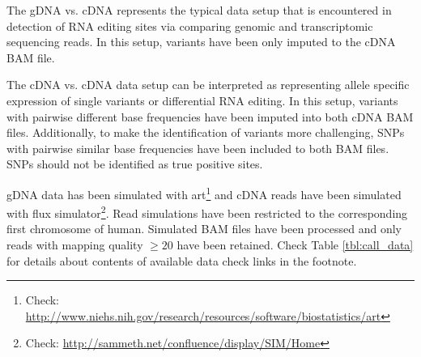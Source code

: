 \documentclass[10pt,a4paper,final]{article}
\begin{document}
The gDNA vs. cDNA represents the typical data setup that is encountered in detection of RNA editing
sites via comparing genomic and transcriptomic sequencing reads. In this setup, variants have been
only imputed to the cDNA BAM file.

The cDNA vs. cDNA data setup can be interpreted as representing allele specific expression of single
variants or differential RNA editing. In this setup, variants with pairwise different base
frequencies have been imputed into both cDNA BAM files. Additionally, to make the identification of
variants more challenging, SNPs with pairwise similar base frequencies have been included to both
BAM files. SNPs should not be identified as true positive sites.

gDNA data has been simulated with art\footnote{Check: 
\url{http://www.niehs.nih.gov/research/resources/software/biostatistics/art}} and cDNA reads
have been simulated with flux simulator\footnote{Check: \url{http://sammeth.net/confluence/display/SIM/Home}}.
Read simulations have been restricted to the corresponding first chromosome of human. Simulated BAM
files have been processed and only reads with mapping quality $\ge 20$ have been retained. Check
Table \ref{tbl:call_data} for details about contents of available data check links in the footnote.
\end{document}
